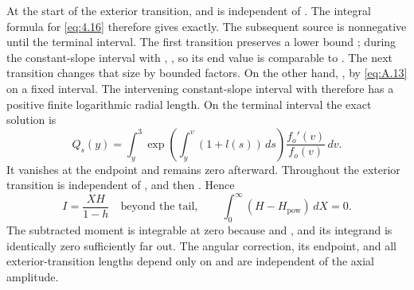 At the start of the exterior transition,  and
 is independent of . The
integral formula for  \eqref{eq:4.16} therefore gives
 exactly. The subsequent source
 is nonnegative until the terminal interval. The first transition
preserves a lower bound ; during the constant-slope interval with
, , so its end value is comparable to
. The next transition changes that size by bounded factors. On the
other hand, , by \eqref{eq:A.13} on a fixed
interval. The intervening constant-slope interval with  therefore has a
positive finite logarithmic radial length. On the terminal interval the exact solution is
\begin{equation}
Q_s(y)=\int_y^3\exp\left(\int_y^v(1+l(s))\,ds\right)\frac{f_o'(v)}{f_o(v)}\,dv.
\tag{A.16}\label{eq:A.16}
\end{equation}
It vanishes at the endpoint and remains zero afterward. Throughout the exterior transition
 is independent of , and then
. Hence
\[
I=\frac{XH}{1-h}\quad\text{beyond the tail},
\qquad
\int_0^\infty(H-H_{\mathrm{pow}})\,dX=0.
\]
The subtracted moment is integrable at zero because
 and , and its
integrand is identically zero sufficiently far out. The angular correction, its endpoint, and all
exterior-transition lengths depend only on  and are independent of the
axial amplitude.

